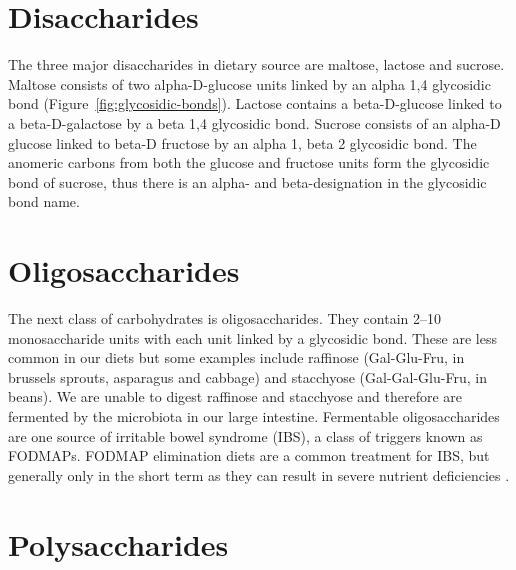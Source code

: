 \documentclass{tufte-handout}
\begin{document}
\section{Disaccharides}

The three major disaccharides in dietary source are maltose, lactose and sucrose. Maltose consists of two alpha-D-glucose units linked by an alpha 1,4 glycosidic bond (Figure~\ref{fig:glycosidic-bonds}). Lactose contains a beta-D-glucose linked to a beta-D-galactose by a beta 1,4 glycosidic bond. Sucrose consists of an alpha-D glucose linked to beta-D fructose by an alpha 1, beta 2 glycosidic bond. The anomeric carbons from both the glucose and fructose units form the glycosidic bond of sucrose, thus there is an alpha- and beta-designation in the glycosidic bond name.

\section{Oligosaccharides}

The next class of carbohydrates is oligosaccharides. They contain 2--10 monosaccharide units with each unit linked by a glycosidic bond.  These are less common in our diets but some examples include raffinose (Gal-Glu-Fru, in brussels sprouts, asparagus and cabbage) and stacchyose (Gal-Gal-Glu-Fru, in beans).  We are unable to digest raffinose and stacchyose and therefore are fermented by the microbiota in our large intestine.   Fermentable oligosaccharides are one source of irritable bowel syndrome (IBS), a class of triggers known as FODMAPs.  FODMAP elimination diets are a common treatment for IBS, but generally only in the short term as they can result in severe nutrient deficiencies \citep{vanlanenEfficacyLowFODMAPDiet2021}.

\section{Polysaccharides}
\end{document}
